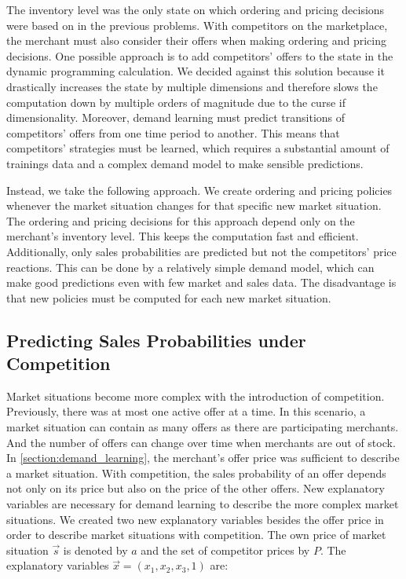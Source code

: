 The inventory level was the only state on which ordering and pricing decisions were based on in the previous problems.
With competitors on the marketplace, the merchant must also consider their offers when making ordering and pricing decisions.
One possible approach is to add competitors' offers to the state in the dynamic programming calculation.
We decided against this solution because it drastically increases the state by multiple dimensions and therefore slows the computation down by multiple orders of magnitude due to the curse if dimensionality.
Moreover, demand learning must predict transitions of competitors' offers from one time period to another.
This means that competitors' strategies must be learned, which requires a substantial amount of trainings data and a complex demand model to make sensible predictions.

Instead, we take the following approach.
We create ordering and pricing policies whenever the market situation changes for that specific new market situation.
The ordering and pricing decisions for this approach depend only on the merchant's inventory level.
This keeps the computation fast and efficient.
Additionally, only sales probabilities are predicted but not the competitors' price reactions.
This can be done by a relatively simple demand model, which can make good predictions even with few market and sales data.
The disadvantage is that new policies must be computed for each new market situation.

\subsection{Predicting Sales Probabilities under Competition}

Market situations become more complex with the introduction of competition.
Previously, there was at most one active offer at a time.
In this scenario, a market situation can contain as many offers as there are participating merchants.
And the number of offers can change over time when merchants are out of stock.
In \cref{section:demand_learning}, the merchant's offer price was sufficient to describe a market situation.
With competition, the sales probability of an offer depends not only on its price but also on the price of the other offers.
New explanatory variables are necessary for demand learning to describe the more complex market situations.
We created two new explanatory variables besides the offer price in order to describe market situations with competition.
The own price of market situation $\vec{s}$ is denoted by $a$ and the set of competitor prices by $P$.
The explanatory variables $\vec{x} = (x_1, x_2, x_3, 1)$ are:

